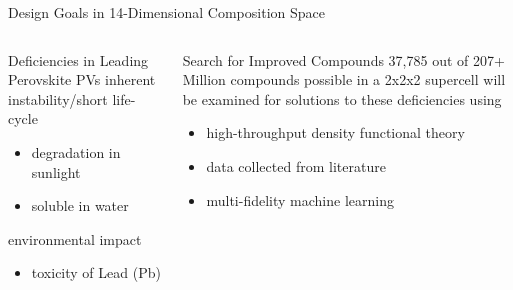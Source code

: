 \documentclass[10pt, aspectratio=169, presentation]{beamer}
\begin{document}
\begin{frame}[label={sec:orgbeee08e}]{Design Goals in \alert{14-Dimensional} Composition Space}
\begin{columns}
\begin{column}{0.5\columnwidth}
\begin{block}{Deficiencies in Leading Perovskite PVs}
inherent instability/short life-cycle
\begin{itemize}
\item degradation in sunlight
\item soluble in water
\end{itemize}
environmental impact
\begin{itemize}
\item toxicity of Lead (Pb)
\end{itemize}
\end{block}

 
\begin{center}

\end{center}
\end{column}

\begin{column}{0.5\columnwidth}
 
\begin{center}

\end{center}

\begin{block}{Search for Improved Compounds}
\alert{37,785} out of \alert{207+ Million} compounds possible in a 2x2x2 supercell
will be examined for solutions to these deficiencies using
\begin{itemize}
\item high-throughput density functional theory
\item data collected from literature
\item multi-fidelity machine learning
\end{itemize}
\end{block}
\end{column}
\end{columns}
\end{frame}
\end{document}
